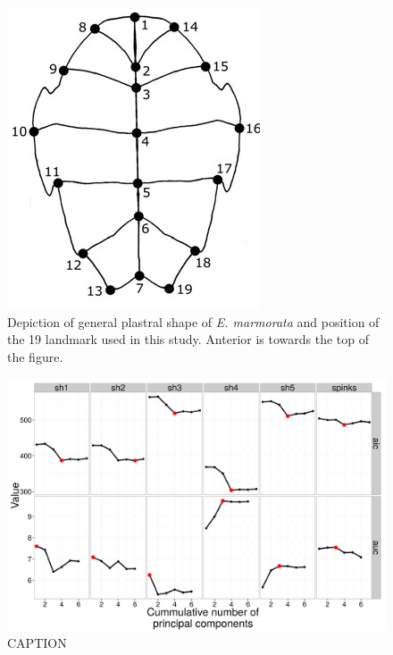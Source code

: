 \documentclass[12pt,letterpaper]{article}
\begin{document}
\begin{figure}[ht]
  \centering
  \includegraphics[height = \textheight, width = \textwidth, keepaspectratio = true]{figure/plastra}
  \caption{Depiction of general plastral shape of \textit{E. marmorata} and position of the 19 landmark used in this study. Anterior is towards the top of the figure.}
  \label{fig:plastra}
\end{figure}

\begin{figure}[ht]
  \centering
  \includegraphics[height = \textheight, width = \textwidth, keepaspectratio = true]{figure/sel_val}
  \caption{CAPTION}
  \label{fig:sel}
\end{figure}
\end{document}
